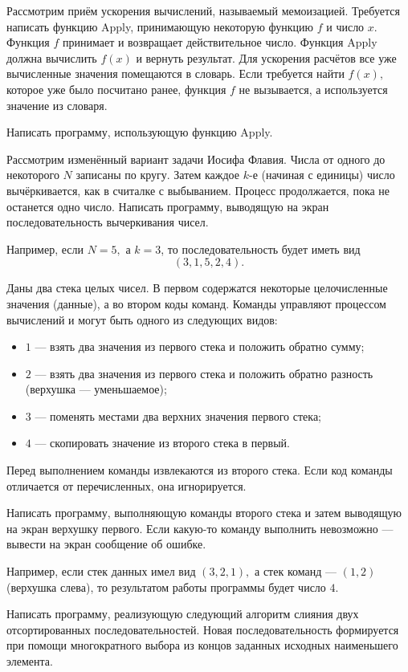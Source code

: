 \task Рассмотрим приём ускорения вычислений, называемый
мемоизацией. Требуется написать функцию Apply, принимающую некоторую
функцию $f$ и число $x$. Функция $f$ принимает и возвращает
действительное число. Функция Apply должна вычислить $f(x)$ и вернуть
результат. Для ускорения расчётов все уже вычисленные значения
помещаются в словарь. Если требуется найти $f(x),$ которое уже было
посчитано ранее, функция $f$ не вызывается, а используется значение из
словаря.

Написать программу, использующую функцию Apply.

\task Рассмотрим изменённый вариант задачи Иосифа Флавия. Числа от
одного до некоторого $N$ записаны по кругу. Затем каждое $k$-е
(начиная с единицы) число вычёркивается, как в считалке с
выбыванием. Процесс продолжается, пока не останется одно
число. Написать программу, выводящую на экран последовательность
вычеркивания чисел.

Например, если $N=5,$ а $k=3$, то последовательность будет иметь вид
\[
(3, 1, 5, 2, 4).
\]

\task Даны два стека целых чисел. В первом содержатся некоторые
целочисленные значения (данные), а во втором коды команд. Команды
управляют процессом вычислений и могут быть одного из следующих видов:
\begin{itemize}
\item $1$ — взять два значения из первого стека и положить обратно
  сумму;
\item $2$ — взять два значения из первого стека и положить обратно
  разность (верхушка — уменьшаемое);
\item $3$ — поменять местами два верхних значения первого стека;
\item $4$ — скопировать значение из второго стека в первый.
\end{itemize}
Перед выполнением команды извлекаются из второго стека. Если код
команды отличается от перечисленных, она игнорируется.

Написать программу, выполняющую команды второго стека и затем
выводящую на экран верхушку первого. Если какую-то команду выполнить
невозможно — вывести на экран сообщение об ошибке.

Например, если стек данных имел вид $(3, 2, 1),$ а стек команд —
$(1, 2)$ (верхушка слева), то результатом работы программы будет число
$4$.

\task Написать программу, реализующую следующий алгоритм слияния двух
отсортированных последовательностей. Новая последовательность
формируется при помощи многократного выбора из концов заданных
исходных наименьшего элемента.


